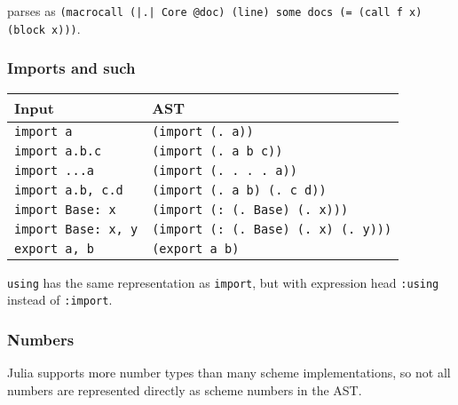 parses as \texttt{(macrocall (|.| Core {\textquotesingle}@doc) (line) {\textquotedbl}some docs{\textquotedbl} (= (call f x) (block x)))}.



\hypertarget{13863161852089184826}{}


\subsubsection{Imports and such}




\begin{table}[h]

\begin{tabulary}{\linewidth}{|L|L|}
\hline
Input & AST \\
\hline
\texttt{import a} & \texttt{(import (. a))} \\
\hline
\texttt{import a.b.c} & \texttt{(import (. a b c))} \\
\hline
\texttt{import ...a} & \texttt{(import (. . . . a))} \\
\hline
\texttt{import a.b, c.d} & \texttt{(import (. a b) (. c d))} \\
\hline
\texttt{import Base: x} & \texttt{(import (: (. Base) (. x)))} \\
\hline
\texttt{import Base: x, y} & \texttt{(import (: (. Base) (. x) (. y)))} \\
\hline
\texttt{export a, b} & \texttt{(export a b)} \\
\hline
\end{tabulary}

\end{table}



\texttt{using} has the same representation as \texttt{import}, but with expression head \texttt{:using} instead of \texttt{:import}.



\hypertarget{13439801024488074381}{}


\subsubsection{Numbers}



Julia supports more number types than many scheme implementations, so not all numbers are represented directly as scheme numbers in the AST.




